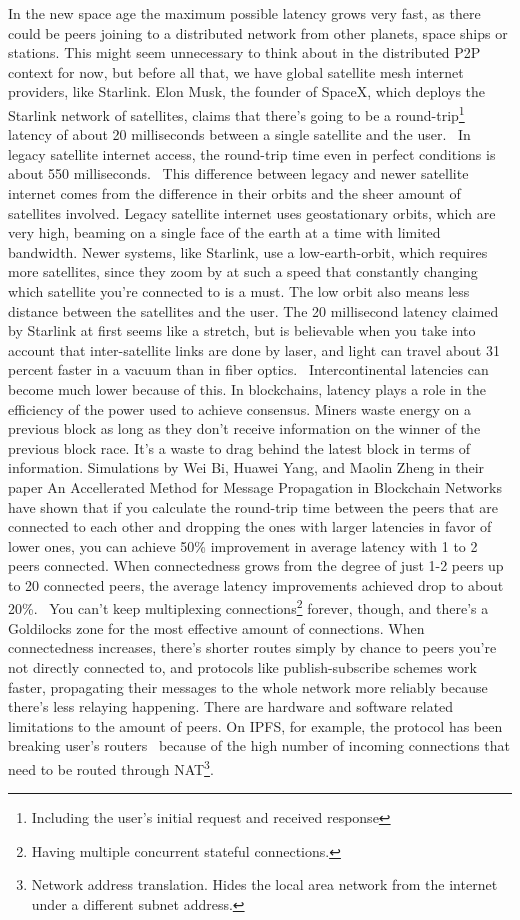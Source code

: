 In the new space age the maximum possible latency grows very fast, as there could be peers joining to a distributed network from other planets, space ships or stations. This might seem unnecessary to think about in the distributed P2P context for now, but before all that, we have global satellite mesh internet providers, like Starlink. Elon Musk, the founder of SpaceX, which deploys the Starlink network of satellites, claims that there's going to be a round-trip\footnote{Including the user's initial request and received response} latency of about 20 milliseconds between a single satellite and the user.~\cite{Tung_undated-ny} In legacy satellite internet access, the round-trip time even in perfect conditions is about 550 milliseconds.~\cite{noauthor_undated-zc} This difference between legacy and newer satellite internet comes from the difference in their orbits and the sheer amount of satellites involved. Legacy satellite internet uses geostationary orbits, which are very high, beaming on a single face of the earth at a time with limited bandwidth. Newer systems, like Starlink, use a low-earth-orbit, which requires more satellites, since they zoom by at such a speed that constantly changing which satellite you're connected to is a must. The low orbit also means less distance between the satellites and the user. The 20 millisecond latency claimed by Starlink at first seems like a stretch, but is believable when you take into account that inter-satellite links are done by laser, and light can travel about 31 percent faster in a vacuum than in fiber optics.~\cite{Finley2013-wt} Intercontinental latencies can become much lower because of this.
In blockchains, latency plays a role in the efficiency of the power used to achieve consensus. Miners waste energy on a previous block as long as they don't receive information on the winner of the previous block race. It's a waste to drag behind the latest block in terms of information. Simulations by Wei Bi, Huawei Yang, and Maolin Zheng in their paper An Accellerated Method for Message Propagation in Blockchain Networks have shown that if you calculate the round-trip time between the peers that are connected to each other and dropping the ones with larger latencies in favor of lower ones, you can achieve 50\% improvement in average latency with 1 to 2 peers connected. When connectedness grows from the degree of just 1-2 peers up to 20 connected peers, the average latency improvements achieved drop to about 20\%.~\cite{Bi_undated-is} You can't keep multiplexing connections\footnote{Having multiple concurrent stateful connections.} forever, though, and there's a Goldilocks zone for the most effective amount of connections. When connectedness increases, there's shorter routes simply by chance to peers you're not directly connected to, and protocols like publish-subscribe schemes work faster, propagating their messages to the whole network more reliably because there's less relaying happening. There are hardware and software related limitations to the amount of peers. On IPFS, for example, the protocol has been breaking user's routers~\cite{Whyrusleeping2016-ej} because of the high number of incoming connections that need to be routed through NAT\footnote{Network address translation. Hides the local area network from the internet under a different subnet address.}.
